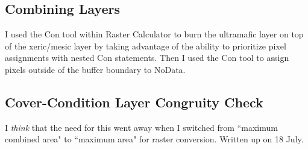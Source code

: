 \subsection{Combining Layers}
I used the Con tool within Raster Calculator to burn the ultramafic layer on top of the xeric/mesic layer by taking advantage of the ability to prioritize pixel assignments with nested Con statements. Then I used the Con tool to assign pixels outside of the buffer boundary to NoData.

\subsection{Cover-Condition Layer Congruity Check}
I \emph{think} that the need for this went away when I switched from ``maximum combined area" to ``maximum area" for raster conversion. Written up on 18 July. 

